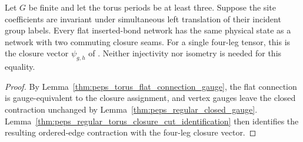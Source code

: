 \begin{lemma}%
    \label{thm:peps_flat_insertion_closure_state}
    \leanok
    Let $G$ be finite and let the torus periods be at least three.
    Suppose the site coefficients are invariant under simultaneous
    left translation of their incident group labels. Every flat
    inserted-bond network has the same physical state as a network
    with two commuting closure seams. For a single four-leg tensor,
    this is the closure vector $\psi_{g,h}$ of
    \cite[Section~5]{Schuch2010PEPS}. Neither injectivity nor
    isometry is needed for this equality.
\end{lemma}

\begin{proof}\leanok
    By Lemma~\ref{thm:peps_torus_flat_connection_gauge}, the flat
    connection is gauge-equivalent to the closure assignment, and vertex
    gauges leave the closed contraction unchanged by
    Lemma~\ref{thm:peps_regular_closed_gauge}.
    Lemma~\ref{thm:peps_regular_torus_closure_cut_identification} then
    identifies the resulting ordered-edge contraction with the
    four-leg closure vector.
\end{proof}

